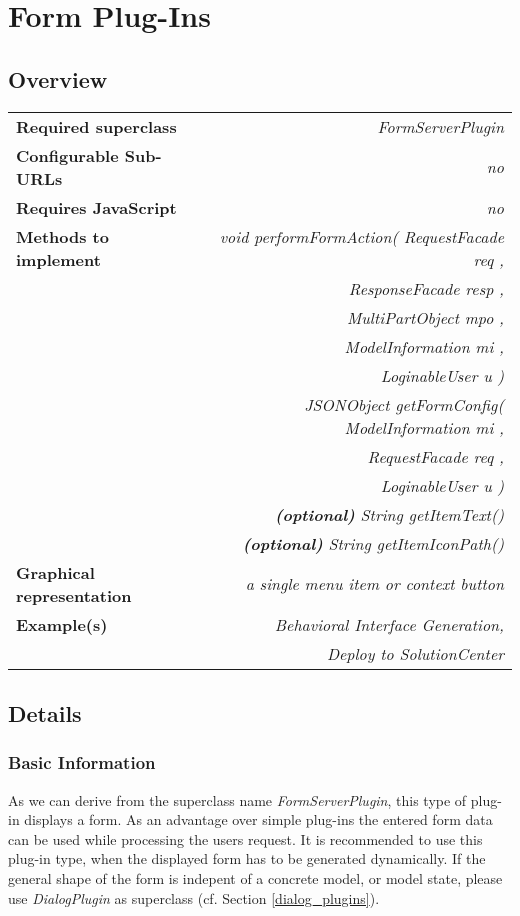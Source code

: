 \section{Form Plug-Ins}
	\subsection{Overview}
		\begin{table}[ht]
			\centering
			\begin{tabular}{@{}lr@{}}
			\toprule
			\textbf{Required superclass} & \textit{FormServerPlugin}
\\
			\textbf{Configurable Sub-URLs} & \textit{no} \\
			\textbf{Requires JavaScript} & \textit{no} \\
			\textbf{Methods to implement} & \textit{void
performFormAction( RequestFacade req , } \\
			& \textit{ResponseFacade resp , } \\
			& \textit{MultiPartObject mpo , }\\
			& \textit{ModelInformation mi , }\\
			& \textit{LoginableUser u )} \\
			\addlinespace
			& \textit{JSONObject getFormConfig( ModelInformation mi , }
\\
			& \textit{RequestFacade req , } \\
			& \textit{LoginableUser u )} \\
			\addlinespace
			& \textit{\textbf{(optional)} String getItemText()} \\
			\addlinespace
			& \textit{\textbf{(optional)} String
getItemIconPath()}\\
			\addlinespace
			\textbf{Graphical representation} & \textit{a single
menu item or context button} \\
			\textbf{Example(s)} & \textit{Behavioral Interface
Generation,} \\
& \textit{Deploy to SolutionCenter} \\
			\bottomrule
			\end{tabular}
		\end{table}
	
	\subsection{Details}
		\subsubsection{Basic Information}
			As we can derive from the superclass name
\textit{FormServerPlugin}, this type of plug-in displays a form. As an advantage over simple plug-ins the entered form
data can be used while processing the users request. It is recommended to use this plug-in type, when the displayed form has to be generated dynamically. If the general shape of the form is indepent of a concrete model, or model state, please use \textit{DialogPlugin} as superclass (cf. Section \ref{dialog_plugins}).
			
